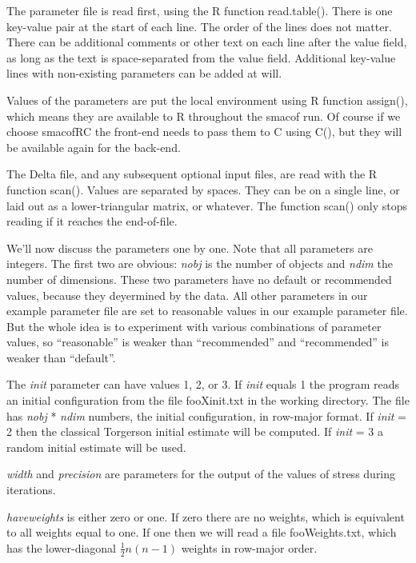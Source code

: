 \documentclass[
  12pt,
]{article}
\begin{document}
The parameter file is read first, using the R function read.table().
There is one key-value pair at the start of each line. The order of the
lines does not matter. There can be additional comments or other text on
each line after the value field, as long as the text is space-separated
from the value field. Additional key-value lines with non-existing
parameters can be added at will.

Values of the parameters are put the local environment using R function
assign(), which means they are available to R throughout the smacof run.
Of course if we choose smacofRC the front-end needs to pass them to C
using C(), but they will be available again for the back-end.

The Delta file, and any subsequent optional input files, are read with
the R function scan(). Values are separated by spaces. They can be on a
single line, or laid out as a lower-triangular matrix, or whatever. The
function scan() only stops reading if it reaches the end-of-file.

We'll now discuss the parameters one by one. Note that all parameters
are integers. The first two are obvious: \emph{nobj} is the number of objects
and \emph{ndim} the number of dimensions. These two parameters have no
default or recommended values, because they deyermined by the data. All
other parameters in our example parameter file are set to reasonable
values in our example parameter file. But the whole idea is to
experiment with various combinations of parameter values, so
``reasonable'' is weaker than ``recommended'' and ``recommended'' is weaker
than ``default''.

The \emph{init} parameter can have values 1, 2, or 3. If \emph{init} equals 1 the
program reads an initial configuration from the file fooXinit.txt in the
working directory. The file has \emph{nobj} * \emph{ndim} numbers, the initial
configuration, in row-major format. If \emph{init} = 2 then the classical
Torgerson initial estimate will be computed. If \emph{init} = 3 a random
initial estimate will be used.

\emph{width} and \emph{precision} are parameters for the output of the values of
stress during iterations.

\emph{haveweights} is either zero or one. If zero there are no weights, which
is equivalent to all weights equal to one. If one then we will read a
file fooWeights.txt, which has the lower-diagonal \(\frac12 n(n-1)\)
weights in row-major order.
\end{document}
